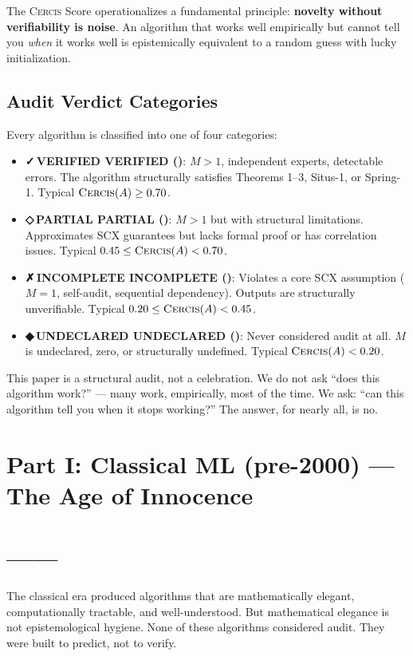 \documentclass[12pt,a4paper]{article}
\theoremstyle{definition}
\newcommand{\guilty}{{\color{guiltycolor}\textbf{◆\,UNDECLARED}}}
\newcommand{\weakness}{{\color{weakcolor}\textbf{◇\,PARTIAL}}}
\newcommand{\verified}{{\color{verifiedcolor}\textbf{✓\,VERIFIED}}}
\newcommand{\fail}{{\color{guiltycolor}\textbf{✗\,INCOMPLETE}}}
\newcommand{\Cercis}{\textsc{Cercis}}
\newcommand{\SCX}{\textsc{SCX}}
\begin{document}
The \Cercis{} Score operationalizes a fundamental principle: \textbf{novelty without verifiability is noise}. An algorithm that works well empirically but cannot tell you \textit{when} it works well is epistemically equivalent to a random guess with lucky initialization.

\subsection{Audit Verdict Categories }

Every algorithm is classified into one of four categories:
\begin{itemize}[nosep]
    \item \textbf{\verified{} VERIFIED ()}: $M > 1$, independent experts, detectable errors. The algorithm structurally satisfies Theorems 1--3, Situs-1, or Spring-1. Typical $\Cercis(A) \ge 0.70$.
    \item \textbf{\weakness{} PARTIAL ()}: $M > 1$ but with structural limitations. Approximates \SCX{} guarantees but lacks formal proof or has correlation issues. Typical $0.45 \le \Cercis(A) < 0.70$.
    \item \textbf{\fail{} INCOMPLETE ()}: Violates a core \SCX{} assumption ($M=1$, self-audit, sequential dependency). Outputs are structurally unverifiable. Typical $0.20 \le \Cercis(A) < 0.45$.
    \item \textbf{\guilty{} UNDECLARED ()}: Never considered audit at all. $M$ is undeclared, zero, or structurally undefined. Typical $\Cercis(A) < 0.20$.
\end{itemize}

This paper is a structural audit, not a celebration. We do not ask ``does this algorithm work?'' — many work, empirically, most of the time. We ask: ``can this algorithm tell you when it stops working?'' The answer, for nearly all, is no.

\section{Part I: Classical ML (pre-2000) — The Age of Innocence}
\section{——}
\label{sec:classical}

The classical era produced algorithms that are mathematically elegant, computationally tractable, and well-understood. But mathematical elegance is not epistemological hygiene. None of these algorithms considered audit. They were built to predict, not to verify.
\end{document}
